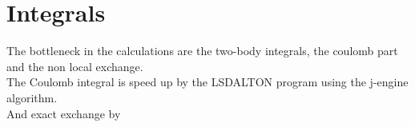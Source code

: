 \documentclass[12pt,a4paper,english]{beamer}
\newcommand{\braopket}[3]{\langle #1|#2|#3\rangle}
\begin{document}
\section{Integrals} \begin{frame} The bottleneck in the calculations are the
        two-body integrals, the coulomb part and the non local exchange. \\

        The Coulomb integral is speed up by the LSDALTON program using the 
        j-engine algorithm. \\

        And exact exchange by 

\end{frame}


%
%
%
%  
%  
%
%
%

%
%
%  
\end{document}
